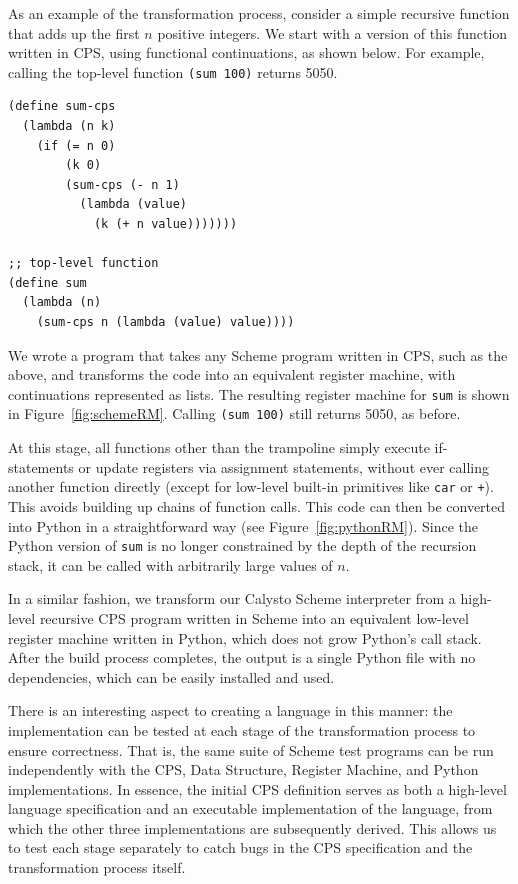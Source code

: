 \documentclass[acmsmall,screen,authorversion]{acmart}
\begin{document}
As an example of the transformation process, consider a simple recursive
function that adds up the first $n$ positive integers.  We start with a version
of this function written in CPS, using functional continuations, as shown
below.  For example, calling the top-level function \texttt{(sum 100)} returns
5050.

{\small
\begin{verbatim}
(define sum-cps
  (lambda (n k)
    (if (= n 0)
        (k 0)
        (sum-cps (- n 1)
          (lambda (value)
            (k (+ n value)))))))

;; top-level function
(define sum
  (lambda (n)
    (sum-cps n (lambda (value) value))))
\end{verbatim}
}

\noindent
We wrote a program that takes any Scheme program written in CPS, such as the
above, and transforms the code into an equivalent register machine, with
continuations represented as lists.  The resulting register machine for
\texttt{sum} is shown in Figure~\ref{fig:schemeRM}.  Calling \texttt{(sum 100)}
still returns 5050, as before.

At this stage, all functions other than the trampoline simply execute
if-statements or update registers via assignment statements, without ever
calling another function directly (except for low-level built-in primitives
like \texttt{car} or \texttt{+}).  This avoids building up chains of function
calls.  This code can then be converted into Python in a straightforward way
(see Figure~\ref{fig:pythonRM}).  Since the Python version of \texttt{sum} is
no longer constrained by the depth of the recursion stack, it can be called
with arbitrarily large values of $n$.

In a similar fashion, we transform our Calysto Scheme interpreter from a
high-level recursive CPS program written in Scheme into an equivalent low-level
register machine written in Python, which does not grow Python's call stack.
After the build process completes, the output is a single Python file with no
dependencies, which can be easily installed and used.

There is an interesting aspect to creating a language in this manner: the
implementation can be tested at each stage of the transformation process to
ensure correctness. That is, the same suite of Scheme test programs can be run
independently with the CPS, Data Structure, Register Machine, and Python
implementations. In essence, the initial CPS definition serves as both a
high-level language specification and an executable implementation of the
language, from which the other three implementations are subsequently
derived. This allows us to test each stage separately to catch bugs in the CPS
specification and the transformation process itself.
\end{document}
